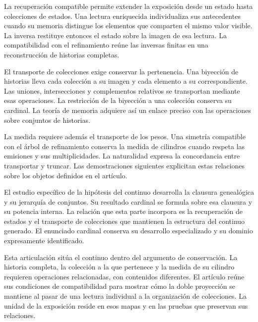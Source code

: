 
La recuperación compatible permite extender la exposición desde
un estado hasta colecciones de estados. Una lectura enriquecida
individualiza sus antecedentes cuando su memoria distingue los
elementos que comparten el mismo valor visible. La inversa
restituye entonces el estado sobre la imagen de esa lectura.
La compatibilidad con el refinamiento reúne las inversas finitas
en una reconstrucción de historias completas.

El transporte de colecciones exige conservar la pertenencia. Una
biyección de historias lleva cada colección a su imagen y cada
elemento a su correspondiente. Las uniones, intersecciones y
complementos relativos se transportan mediante esas operaciones.
La restricción de la biyección a una colección conserva su cardinal.
La teoría de memoria adquiere así un enlace preciso con las
operaciones sobre conjuntos de historias.

La medida requiere además el transporte de los pesos. Una
simetría compatible con el árbol de refinamiento conserva la
medida de cilindros cuando respeta las emisiones y sus
multiplicidades. La naturalidad expresa la concordancia entre
transportar y truncar. Las demostraciones siguientes explicitan
estas relaciones sobre los objetos definidos en el artículo.

El estudio específico de la hipótesis del continuo desarrolla
la clausura genealógica y su jerarquía de conjuntos. Su resultado
cardinal se formula sobre esa clausura y su potencia interna.
La relación que esta parte incorpora es la recuperación de
estados y el transporte de colecciones que mantienen la estructura
del continuo generado. El enunciado cardinal conserva su
desarrollo especializado y su dominio expresamente identificado.

Esta articulación sitúa el continuo dentro del argumento de
conservación. La historia completa, la colección a la que pertenece
y la medida de su cilindro requieren operaciones relacionadas,
con contenidos diferentes. El artículo reúne sus condiciones de
compatibilidad para mostrar cómo la doble proyección se mantiene
al pasar de una lectura individual a la organización de colecciones.
La unidad de la exposición reside en esos mapas y en las pruebas
que preservan sus relaciones.
